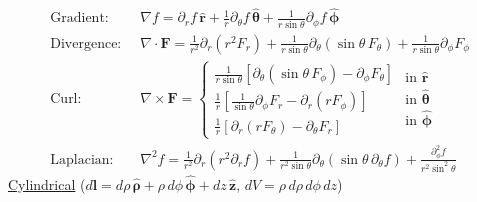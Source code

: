 \begin{align*}
\text{Gradient:}   \;\; &\nabla f = \partial_r f\,\hat{\mathbf{r}} 
                                 + \frac{1}{r}\partial_\theta f\,\bm{\hat{\theta}} 
                                 + \frac{1}{r\sin\theta}\partial_\phi f\,\bm{\hat{\phi}} \\[2pt]
\text{Divergence:} \;\; &\nabla \cdot \mathbf{F} = \frac{1}{r^2}\partial_r (r^2 F_r) 
                                 + \frac{1}{r\sin\theta}\partial_\theta (\sin\theta\,F_\theta) 
                                 + \frac{1}{r\sin\theta}\partial_\phi F_\phi \\[2pt]
\text{Curl:}       \;\; &\nabla \times \mathbf{F} = \begin{cases}
                                  \frac{1}{r\sin\theta}\left[\partial_\theta (\sin\theta\,F_\phi) - \partial_\phi F_\theta\right] \\[7pt]
                                  \frac{1}{r}\left[\frac{1}{\sin\theta}\partial_\phi F_r - \partial_r (r F_\phi)\right] \\[7pt]
                                  \frac{1}{r}\left[\partial_r (r F_\theta) - \partial_\theta F_r\right]
                                  \end{cases}
                                  \begin{matrix}
                                  \text{in } \hat{\mathbf{r}} \\[7pt]
                                  \text{in } \bm{\hat{\theta}} \\[7pt]
                                  \text{in } \bm{\hat{\phi}}
                                  \end{matrix} \\[2pt]
\text{Laplacian:}  \;\; &\nabla^2 f = \frac{1}{r^2}\partial_r \left(r^2\partial_r f\right) 
                                 + \frac{1}{r^2\sin\theta}\partial_\theta \left(\sin\theta\,\partial_\theta f\right) 
                                 + \frac{\partial^2_\phi f}{r^2\sin^2\theta}
\end{align*}
\underline{Cylindrical} ($d\mathbf{l} = d\rho\,\bm{\hat{\rho}} + \rho\,d\phi\,\bm{\hat{\phi}} + dz\,\hat{\mathbf{z}}$, $dV = \rho\,d\rho\,d\phi\,dz$)
